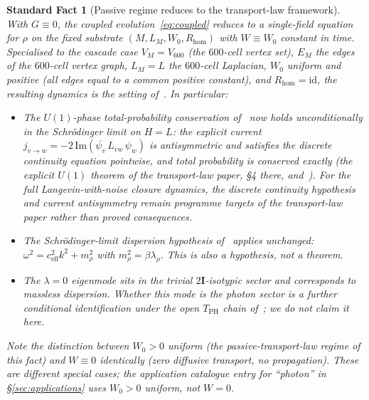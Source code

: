 \documentclass[11pt]{article}
\newtheorem{fact}[theorem]{Standard Fact}
\theoremstyle{definition}
\newcommand{\twoI}{2\mathbf{I}}
\begin{document}
\begin{fact}[Passive regime reduces to the transport-law framework]\label{fact:passive}
With $G \equiv 0$, the coupled evolution~\eqref{eq:coupled} reduces to a single-field equation for $\rho$ on the fixed substrate $(M, L_M, W_0, R_{\mathrm{hom}})$ with $W \equiv W_0$ constant in time. Specialised to the cascade case $V_M = V_{600}$ (the $600$-cell vertex set), $E_M$ the edges of the $600$-cell vertex graph, $L_M = L$ the $600$-cell Laplacian, $W_0$ uniform and positive (all edges equal to a common positive constant), and $R_{\mathrm{hom}} = \mathrm{id}$, the resulting dynamics is the setting of~\citep{SmartTransportLaw}. In particular:
\begin{itemize}
    \item The $U(1)$-phase total-probability conservation of~\citep{SmartTransportLaw} now holds unconditionally in the Schr\"{o}dinger limit on $H = L$: the explicit current $j_{v\to w} = -2\,\mathrm{Im}(\overline{\psi_v}\,L_{vw}\,\psi_w)$ is antisymmetric and satisfies the discrete continuity equation pointwise, and total probability is conserved exactly (the explicit $U(1)$ theorem of the transport-law paper, \S 4 there, and~\citep{SmartTransportLaw}). For the full Langevin-with-noise closure dynamics, the discrete continuity hypothesis and current antisymmetry remain programme targets of the transport-law paper rather than proved consequences.
    \item The Schr\"{o}dinger-limit dispersion hypothesis of~\citep{SmartTransportLaw} applies unchanged: $\omega^2 = c_{\text{eff}}^2 k^2 + m_\rho^2$ with $m_\rho^2 = \beta\lambda_\rho$. This is also a hypothesis, not a theorem.
    \item The $\lambda = 0$ eigenmode sits in the trivial $\twoI$-isotypic sector and corresponds to massless dispersion. Whether this mode is the \emph{photon} sector is a further conditional identification under the open $T_{\text{PH}}$ chain of~\citep{CascadeAlphaChain}; we do not claim it here.
\end{itemize}
Note the distinction between $W_0 > 0$ uniform (the passive-transport-law regime of this fact) and $W \equiv 0$ identically (zero diffusive transport, no propagation). These are different special cases; the application catalogue entry for ``photon'' in \S\ref{sec:applications} uses $W_0 > 0$ uniform, not $W = 0$.
\end{fact}
\end{document}
